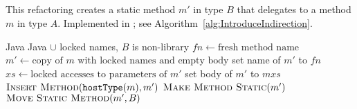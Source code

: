 \subsection{}
This refactoring creates a static method $m'$ in type $B$ that delegates to a method $m$ in type $A$. Implemented in ; see Algorithm~\ref{alg:IntroduceIndirection}.

\begin{algorithm}
\caption{$\refactoring{Introduce Indirection}(m : \type{Method}, B : \type{ClassOrInterface})$}
\label{alg:IntroduceIndirection}
\begin{algorithmic}[1]
\REQUIRE Java
\ENSURE Java $\cup$ locked names, 
\medskip
\STATE \assert $B$ is non-library
\STATE $fn \leftarrow \text{fresh method name}$
\STATE $m' \leftarrow \text{copy of $m$ with locked names and empty body}$
\STATE set name of $m'$ to $fn$
\STATE $xs \leftarrow \text{locked accesses to parameters of $m'$}$
\STATE set body of $m'$ to \xspace$m$\code{(}$xs$\code{);}
\STATE $\textsc{Insert Method}(\text{\texttt{hostType}}(m), m')$
\STATE $\textsc{Make Method Static}(m')$
\STATE $\textsc{Move Static Method}(m', B)$
\end{algorithmic}
\end{algorithm}
